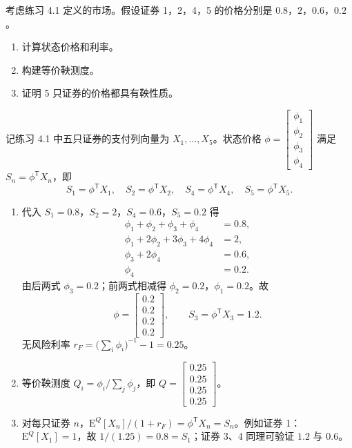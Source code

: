 \begin{problem}
 考虑练习 4.1 定义的市场。假设证券 1，2，4，5 的价格分别是 $0.8$，$2$，$0.6$，$0.2$。
\begin{enumerate}[label=(\alph*)]
    \item 计算状态价格和利率。
    \item 构建等价鞅测度。
    \item 证明 5 只证券的价格都具有鞅性质。
\end{enumerate}
\end{problem}
\begin{solution}
记练习 4.1 中五只证券的支付列向量为 $X_{1},\ldots,X_{5}$。状态价格 $\phi=\begin{bmatrix}\phi_{1} \\ \phi_{2} \\ \phi_{3} \\ \phi_{4}\end{bmatrix}$ 满足 $S_{n}=\phi^{\mathsf T}X_{n}$，即
\[
    S_{1}=\phi^{\mathsf T}X_{1},\quad S_{2}=\phi^{\mathsf T}X_{2},\quad S_{4}=\phi^{\mathsf T}X_{4},\quad S_{5}=\phi^{\mathsf T}X_{5}.
\]
\begin{enumerate}[label=(\alph*)]
    \item 代入 $S_{1}=0.8$，$S_{2}=2$，$S_{4}=0.6$，$S_{5}=0.2$ 得
    \[
        \begin{aligned}
            \phi_{1}+\phi_{2}+\phi_{3}+\phi_{4}&=0.8,\\
            \phi_{1}+2\phi_{2}+3\phi_{3}+4\phi_{4}&=2,\\
            \phi_{3}+2\phi_{4}&=0.6,\\
            \phi_{4}&=0.2.
        \end{aligned}
    \]
    由后两式 $\phi_{3}=0.2$；前两式相减得 $\phi_{2}=0.2$，$\phi_{1}=0.2$。故
    \[
        \phi=\begin{bmatrix}0.2 \\ 0.2 \\ 0.2 \\ 0.2\end{bmatrix},\qquad
        S_{3}=\phi^{\mathsf T}X_{3}=1.2.
    \]
    无风险利率 $r_{F}=\bigl(\sum_{i}\phi_{i}\bigr)^{-1}-1=0.25$。
    \item 等价鞅测度 $Q_{i}=\phi_{i}/\sum_{j}\phi_{j}$，即 $Q=\begin{bmatrix}0.25 \\ 0.25 \\ 0.25 \\ 0.25\end{bmatrix}$。
    \item 对每只证券 $n$，$\mathrm{E}^{Q}[X_{n}]/(1+r_{F})=\phi^{\mathsf T}X_{n}=S_{n}$。例如证券 1：$\mathrm{E}^{Q}[X_{1}]=1$，故 $1/(1.25)=0.8=S_{1}$；证券 3、4 同理可验证 $1.2$ 与 $0.6$。
\end{enumerate}
\end{solution}

